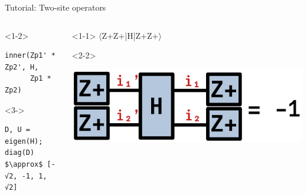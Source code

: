 \begin{frame}[fragile]{Tutorial: Two-site operators}

\begin{columns}

\begin{column}{5cm}

\begin{onlyenv}<1-2>
\begin{lstlisting}[language=JuliaLocal, style=julia, basicstyle=\scriptsize\ttfamily]
inner(Zp1' * Zp2', H,
      Zp1 * Zp2)
\end{lstlisting}
\end{onlyenv}

\begin{onlyenv}<3->
\begin{lstlisting}[language=JuliaLocal, style=julia, mathescape, basicstyle=\scriptsize\ttfamily]
D, U = eigen(H);
diag(D) $\approx$ [-√2, -1, 1, √2]
\end{lstlisting}
\end{onlyenv}

\end{column}

\begin{column}{5cm}

\begin{onlyenv}<1-1>
$\langle$Z+Z+|H|Z+Z+$\rangle$ \\
\end{onlyenv}

\begin{onlyenv}<2-2>
\vspace*{0.0cm}
\begin{center}
\includegraphics[width=1.0\textwidth]{
  slides/assets/Zp1Zp2HZp1Zp2.png
}
\end{center}
\vspace*{0.0cm}
\end{onlyenv}



\end{column}
\end{columns}
\end{frame}
